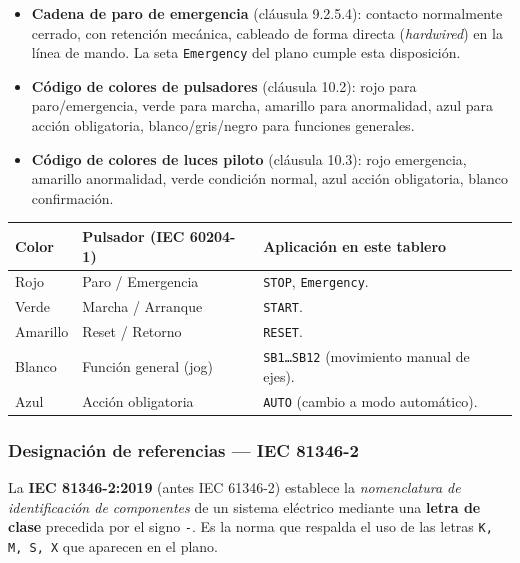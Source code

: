 \documentclass[11pt]{article}
\begin{document}
\begin{itemize}[leftmargin=1.4em]
	\item \textbf{Cadena de paro de emergencia} (cláusula 9.2.5.4):
	contacto normalmente cerrado, con retención mecánica, cableado
	de forma directa (\emph{hardwired}) en la línea de mando. La
	seta \texttt{Emergency} del plano cumple esta disposición.
	\item \textbf{Código de colores de pulsadores} (cláusula 10.2):
	rojo para paro/emergencia, verde para marcha, amarillo para
	anormalidad, azul para acción obligatoria, blanco/gris/negro
	para funciones generales.
	\item \textbf{Código de colores de luces piloto} (cláusula 10.3):
	rojo emergencia, amarillo anormalidad, verde condición normal,
	azul acción obligatoria, blanco confirmación.
\end{itemize}

\begin{center}
	\small
	\begin{tabularx}{\linewidth}{@{}l l X@{}}
		\toprule
		\textbf{Color} & \textbf{Pulsador (IEC 60204-1)} & \textbf{Aplicación en este tablero} \\
		\midrule
		Rojo     & Paro / Emergencia          & \texttt{STOP}, \texttt{Emergency}.\\
		Verde    & Marcha / Arranque          & \texttt{START}.\\
		Amarillo & Reset / Retorno            & \texttt{RESET}.\\
		Blanco   & Función general (jog)      & \texttt{SB1\dots SB12} (movimiento manual de ejes).\\
		Azul     & Acción obligatoria         & \texttt{AUTO} (cambio a modo automático).\\
		\bottomrule
	\end{tabularx}
\end{center}

\subsubsection{Designación de referencias — IEC 81346-2}

La \textbf{IEC 81346-2:2019} (antes IEC 61346-2) establece la
\emph{nomenclatura de identificación de componentes} de un sistema
eléctrico mediante una \textbf{letra de clase} precedida por el signo
\texttt{-}. Es la norma que respalda el uso de las letras \texttt{K,
	M, S, X} que aparecen en el plano.
\end{document}
